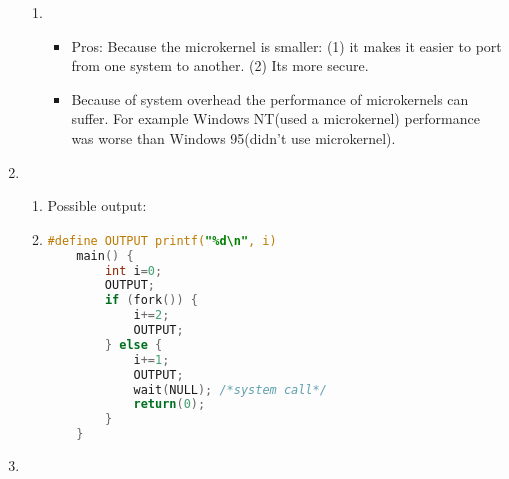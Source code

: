 \documentclass{article} %
\begin{document}
\begin{enumerate}
\begin{enumerate}[label=(\alph*)]
            \item
                \begin{itemize}
                    \item             
                        Pros: Because the microkernel is smaller: (1) it makes it easier to port 
                        from one system to another. (2) Its more secure. 
                    \item   
                        Because of system overhead the performance of microkernels can suffer.
                        For example Windows NT(used a microkernel) performance 
                        was worse than Windows 95(didn't use microkernel).
                \end{itemize}
                \hfill
        \end{enumerate}
        \newpage
    \item
        \begin{enumerate}
            \item
                \begin{enumerate}[label={}]
                        Possible output:
                \end{enumerate}
                \hfill
            \item
                \begin{lstlisting}[language=C]
    #define OUTPUT printf("%d\n", i)
    main() {
        int i=0;
        OUTPUT;
        if (fork()) {
            i+=2;
            OUTPUT;
        } else {
            i+=1;
            OUTPUT;
            wait(NULL); /*system call*/
            return(0);
        }
    }
                \end{lstlisting}
        \end{enumerate}
        \hfill
    \item
        \begin{enumerate}[label=(\alph*)]

\end{enumerate}
\end{enumerate}
\end{document}
